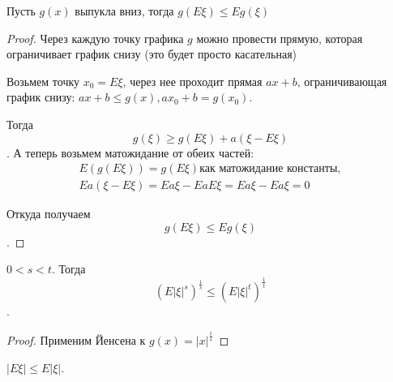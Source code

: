 \begin{theorem}

Пусть $g(x)$ выпукла вниз, тогда $g(E \xi) \leq E g(\xi)$
\end{theorem}
\begin{proof}
    Через каждую точку графика $g$ можно провести прямую, которая ограничивает график снизу (это будет просто касательная)
    
    Возьмем точку $x_0 = E \xi$, через нее проходит прямая $ax + b$, ограничивающая график снизу: $ax + b \leq g(x), ax_0 + b = g(x_0)$.

    Тогда $$g(\xi) \geq g(E\xi) + a(\xi - E\xi)$$. 
    А теперь возьмем матожидание от обеих частей: 
    \begin{gather*}
    E(g(E\xi)) = g(E\xi) \text{как матожидание константы},\\
    E a(\xi - E\xi) = E a\xi - E aE\xi = E a\xi - E a\xi = 0
    \end{gather*}
    
    Откуда получаем $$g(E \xi) \leq E g(\xi)$$.
\end{proof}
\begin{conseq}
    $0 < s < t$. Тогда $$(E |\xi|^s)^\frac1s \leq (E |\xi|^t)^\frac1t$$.
\end{conseq}
\begin{proof}
    Применим Йенсена к $g(x) = |x|^\frac{t}{s}$
\end{proof}
\begin{conseq}
$|E\xi| \leq E|\xi|$.
\end{conseq}

